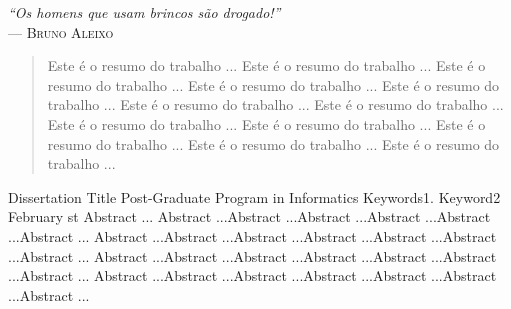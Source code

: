 \documentclass[tg]{mdtufsm}
\begin{document}
\clearpage
\begin{flushright}
\mbox{}\vfill
{\sffamily\itshape
``Os homens que usam brincos são drogado!'' \\ }
--- \textsc{Bruno Aleixo}
\end{flushright}


\begin{abstract}
Este é o resumo do trabalho ... Este é o resumo do trabalho ...
Este é o resumo do trabalho ... Este é o resumo do trabalho ...
Este é o resumo do trabalho ... Este é o resumo do trabalho ...
Este é o resumo do trabalho ... Este é o resumo do trabalho ...
Este é o resumo do trabalho ... Este é o resumo do trabalho ...
Este é o resumo do trabalho ... Este é o resumo do trabalho ...
\end{abstract}

\begin{englishabstract}
{Dissertation Title}
{Post-Graduate Program in Informatics}
{Keywords1. Keyword2}
{February}
{st}
Abstract ... Abstract ...Abstract ...Abstract ...Abstract ...Abstract ...Abstract ...
Abstract ...Abstract ...Abstract ...Abstract ...Abstract ...Abstract ...Abstract ...
Abstract ...Abstract ...Abstract ...Abstract ...Abstract ...Abstract ...Abstract ...
Abstract ...Abstract ...Abstract ...Abstract ...Abstract ...Abstract ...Abstract ...
\end{englishabstract}


\listoffigures

\end{document}
